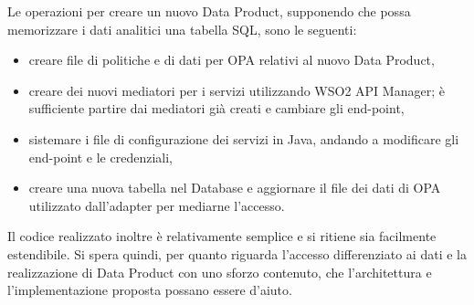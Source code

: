 \documentclass[12pt]{report}
\begin{document}
Le operazioni per creare un nuovo Data Product, supponendo che possa memorizzare i dati analitici una tabella SQL, sono le seguenti: 
\begin{itemize}
    \item creare file di politiche e di dati per OPA relativi al nuovo Data Product,
    \item creare dei nuovi mediatori per i servizi utilizzando WSO2 API Manager; è sufficiente partire dai mediatori già creati e cambiare gli end-point,
    \item sistemare i file di configurazione dei servizi in Java, andando a modificare gli end-point e le credenziali,
    \item creare una nuova tabella nel Database e aggiornare il file dei dati di OPA utilizzato dall'adapter per mediarne l'accesso.
\end{itemize} 
Il codice realizzato inoltre è relativamente semplice e si ritiene sia facilmente estendibile.
Si spera quindi, per quanto riguarda l'accesso differenziato ai dati e la realizzazione di Data Product con uno sforzo contenuto, che l'architettura e l'implementazione proposta possano essere d'aiuto.
\end{document}

